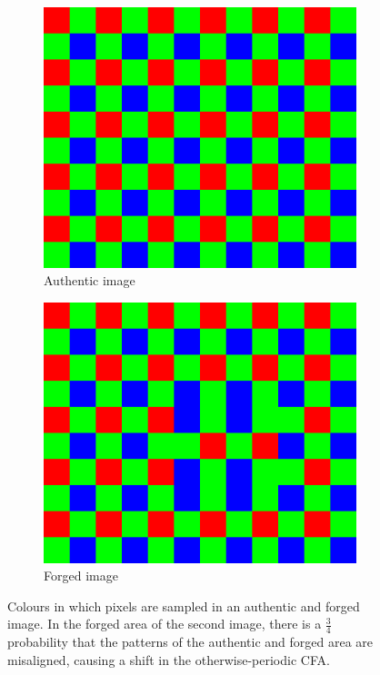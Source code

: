 \documentclass{ipol}
\begin{document}
\begin{figure}[ht]
        \centering
        \begin{subfigure}{.5\linewidth}
                \includegraphics[width=.9\linewidth]{images/bayer.png}
                \caption{Authentic image}
        \end{subfigure}\hfill%
        \begin{subfigure}{.5\linewidth}
                \includegraphics[width=.9\linewidth]{images/bayer_forged.png}
                \caption{Forged image}
        \end{subfigure}
        \label{fig:forgeryshift}
        \caption{Colours in which pixels are sampled in an authentic and forged image. In the forged area of the second image, there is a $\frac34$ probability that the patterns of the authentic and forged area are misaligned, causing a shift in the otherwise-periodic CFA.}
\end{figure}
\end{document}
